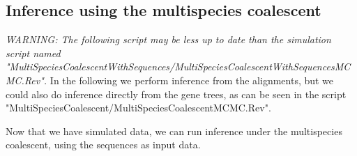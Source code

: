 \documentclass[11pt]{article}
\begin{document}
\subsection{Inference using the multispecies coalescent }
{\begin{framed}
\begin{center}
\emph{WARNING: The following script may be less up to date than the simulation script named "MultiSpeciesCoalescentWithSequences/MultiSpeciesCoalescentWithSequencesMCMC.Rev".}
In the following we perform inference from the alignments, but we could also do inference directly from the gene trees, as can be seen in the script "MultiSpeciesCoalescent/MultiSpeciesCoalescentMCMC.Rev".
\end{center}
\end{framed}}
\vspace{5mm}


Now that we have simulated data, we can run inference under the multispecies coalescent, using the sequences as input data.
\end{document}
